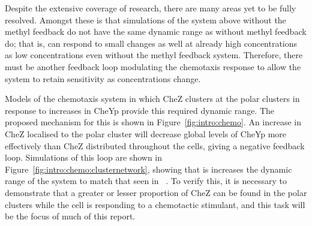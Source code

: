 \documentclass[../main.tex]{subfiles}
\begin{document}
Despite the extensive coverage of research, there are many areas yet to be fully resolved. Amongst these is that simulations of the system above without the methyl feedback do not have the same dynamic range as \ecoli without methyl feedback do; that is, \ecoli can respond to small changes as well at already high concentrations as low concentrations even without the methyl feedback system. Therefore, there must be another feedback loop modulating the chemotaxis response to allow the system to retain sensitivity as concentrations change.

Models of the chemotaxis system in which CheZ clusters at the polar clusters in response to increases in CheYp provide this required dynamic range. The proposed mechanism for this is shown in Figure~\ref{fig:intro:chemo}. An increase in CheZ localised to the polar cluster will decrease global levels of CheYp more effectively than CheZ distributed throughout the cells, giving a negative feedback loop. Simulations of this loop are shown in Figure~\ref{fig:intro:chemo:clusternetwork}, showing that is increases the dynamic range of the system to match that seen in \ecoli~\citep{lipkow06}. To verify this, it is necessary to demonstrate that a greater or lesser proportion of CheZ can be found in the polar clusters while the cell is responding to a chemotactic stimulant, and this task will be the focus of much of this report.
\end{document}
